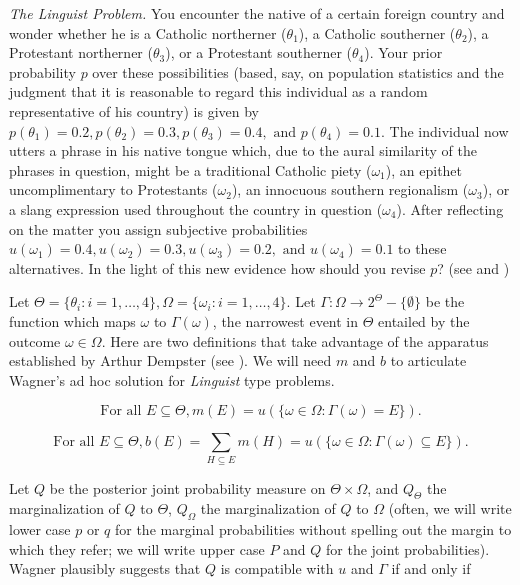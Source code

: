 \documentclass[11pt]{article}
\begin{document}
\begin{quotex}
  \emph{The Linguist Problem.} You encounter the native of a certain
  foreign country and wonder whether he is a Catholic northerner
  ($\theta_{1}$), a Catholic southerner ($\theta_{2}$), a Protestant
  northerner ($\theta_{3}$), or a Protestant southerner
  ($\theta_{4}$). Your prior probability $p$ over these possibilities
  (based, say, on population statistics and the judgment that it is
  reasonable to regard this individual as a random representative of
  his country) is given by
  $p(\theta_{1})=0.2,p(\theta_{2})=0.3,p(\theta_{3})=0.4,\mbox{ and
  }p(\theta_{4})=0.1$. The individual now utters a phrase in his
  native tongue which, due to the aural similarity of the phrases in
  question, might be a traditional Catholic piety ($\omega_{1}$), an
  epithet uncomplimentary to Protestants ($\omega_{2}$), an innocuous
  southern regionalism ($\omega_{3}$), or a slang expression used
  throughout the country in question ($\omega_{4}$). After reflecting
  on the matter you assign subjective probabilities
  $u(\omega_{1})=0.4,u(\omega_{2})=0.3,u(\omega_{3})=0.2,\mbox{ and
  }u(\omega_{4})=0.1$ to these alternatives. In the light of this new
  evidence how should you revise $p$? (see 
  and )
\end{quotex}

Let $\Theta=\{\theta_{i}:i=1,\ldots,4\},\Omega=\{\omega_{i}:i=1,\ldots,4\}$.
Let $\Gamma:\Omega\rightarrow{}2^{\Theta}-\{\emptyset\}$ be the function
which maps $\omega$ to $\Gamma(\omega)$, the narrowest event in
$\Theta$ entailed by the outcome $\omega\in\Omega$. Here are two
definitions that take advantage of the apparatus established by Arthur
Dempster (see ). We will need $m$ and $b$ to
articulate Wagner's ad hoc solution for \emph{Linguist} type problems.

\begin{equation}
  \mbox{For all }E\subseteq{}\Theta, m(E)=u(\{\omega\in\Omega:\Gamma(\omega)=E\})\label{eq:mof}.
\end{equation}

\begin{equation}
  \mbox{For all }E\subseteq{}\Theta, b(E)=\sum_{H\subseteq{}E}m(H)=u(\{\omega\in\Omega:\Gamma(\omega)\subseteq{}E\})\label{eq:bof}.
\end{equation}

Let $Q$ be the posterior joint probability measure on
$\Theta\times\Omega$, and $Q_{\Theta}$ the marginalization of $Q$ to
$\Theta$, $Q_{\Omega}$ the marginalization of $Q$ to $\Omega$ (often,
we will write lower case $p$ or $q$ for the marginal probabilities
without spelling out the margin to which they refer; we will write
upper case $P$ and $Q$ for the joint probabilities). Wagner plausibly
suggests that $Q$ is compatible with $u$ and $\Gamma$ if and only if
\end{document}
